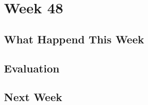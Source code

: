 \section*{Week 48}
\subsection*{What Happend This Week}


\subsection*{Evaluation}


\subsection*{Next Week}

